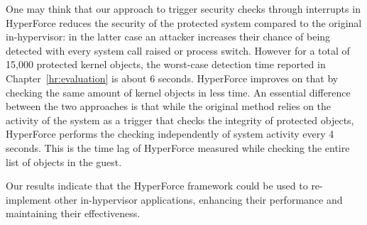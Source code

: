 One may think that our approach to trigger security checks through interrupts in HyperForce reduces the security of the protected system compared to the original in-hypervisor: in the latter case an attacker increases their chance of being detected with every system call raised or process switch. However for a total
of 15,000 protected kernel objects, the worst-case detection time reported in Chapter~\ref{hr:evaluation} is about 6 seconds. 
HyperForce improves on that by checking the same amount of kernel objects in less time. 
An essential difference between the two approaches is that while the original method relies on the activity of the system as a trigger that checks the integrity of protected objects, HyperForce performs the checking independently of system activity every 4 seconds. This is the time lag of HyperForce measured while checking the entire list of objects in the guest.  

Our results indicate that the HyperForce framework could be used to re-implement other in-hypervisor applications, enhancing their performance and maintaining their effectiveness.
%











